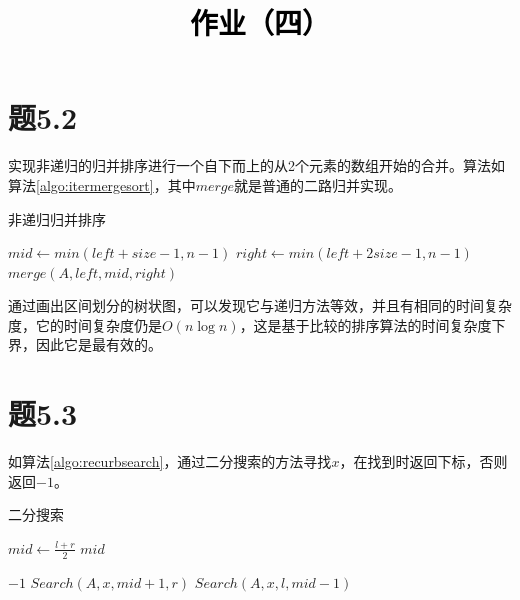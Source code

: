 \documentclass[a4paper,twoside]{article}
\newcommand{\PaperTitle}{作业（四）}  %
\begin{document}
\newpage

\title{
	\Large{\textcolor{black}{\PaperTitle}}
}
	
	
\maketitle
	
\tableofcontents
 
\newpage
\setcounter{page}{1}

\begin{spacing}{1.2}

\section{题5.2}

实现非递归的归并排序进行一个自下而上的从2个元素的数组开始的合并。算法如算法\ref{algo:itermergesort}，其中$merge$就是普通的二路归并实现。

\begin{algorithm}
	\caption{非递归归并排序}
	\label{algo:itermergesort}
	\begin{algorithmic}[1]
		\State $mid \gets min(left+size-1,n-1)$
		\State $right \gets min(left+2size-1,n-1)$
		\State $merge(A,left,mid,right)$
		\EndFor
		\EndFor
		\EndProcedure
		
	\end{algorithmic}
\end{algorithm}	

通过画出区间划分的树状图，可以发现它与递归方法等效，并且有相同的时间复杂度，它的时间复杂度仍是$O(n\log n)$，这是基于比较的排序算法的时间复杂度下界，因此它是最有效的。

\section{题5.3}
如算法\ref{algo:recurbsearch}，通过二分搜索的方法寻找$x$，在找到时返回下标，否则返回$-1$。

\begin{algorithm}
	\caption{二分搜索}
	\label{algo:recurbsearch}
	\begin{algorithmic}[1]
		\State $mid \gets \frac{l+r}{2} $
		\Return $mid$
		\EndIf
		
		\Return $-1$
		\Return $Search(A,x,mid+1,r)$
		\Return $Search(A,x,l,mid-1)$
		\EndIf
		

\end{algorithmic}
\end{algorithm}
\end{spacing}
\end{document}
